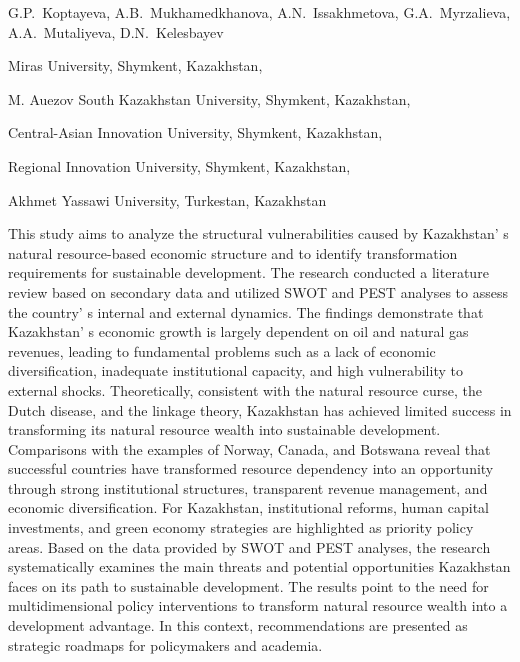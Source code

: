 
\begin{header}

G.P.~Koptayeva,
A.B.~Mukhamedkhanova\envelope,
A.N.~Issakhmetova,
G.A.~Myrzalieva,
A.A.~Mutaliyeva,
D.N.~Kelesbayev
\end{header}

\begin{affil}
Miras University, Shymkent, Kazakhstan,

M. Auezov South Kazakhstan University, Shymkent, Kazakhstan,

Central-Asian Innovation University, Shymkent, Kazakhstan,

Regional Innovation University, Shymkent, Kazakhstan,

Akhmet Yassawi University, Turkestan, Kazakhstan

\end{affil}

This study aims to analyze the structural vulnerabilities caused by
Kazakhstan' s natural resource-based economic structure
and to identify transformation requirements for sustainable development.
The research conducted a literature review based on secondary data and
utilized SWOT and PEST analyses to assess the country' s
internal and external dynamics. The findings demonstrate that
Kazakhstan' s economic growth is largely dependent on oil
and natural gas revenues, leading to fundamental problems such as a lack
of economic diversification, inadequate institutional capacity, and high
vulnerability to external shocks. Theoretically, consistent with the
natural resource curse, the Dutch disease, and the linkage theory,
Kazakhstan has achieved limited success in transforming its natural
resource wealth into sustainable development. Comparisons with the
examples of Norway, Canada, and Botswana reveal that successful
countries have transformed resource dependency into an opportunity
through strong institutional structures, transparent revenue management,
and economic diversification. For Kazakhstan, institutional reforms,
human capital investments, and green economy strategies are highlighted
as priority policy areas. Based on the data provided by SWOT and PEST
analyses, the research systematically examines the main threats and
potential opportunities Kazakhstan faces on its path to sustainable
development. The results point to the need for multidimensional policy
interventions to transform natural resource wealth into a development
advantage. In this context, recommendations are presented as strategic
roadmaps for policymakers and academia.

